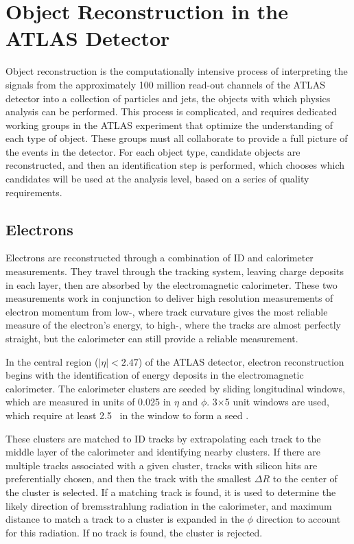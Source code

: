\chapter{Object Reconstruction in the \ac{ATLAS} Detector} %
\label{ch:reconstruction} 

Object reconstruction is the computationally intensive process of interpreting the signals from the approximately 100 million read-out channels of the \ac{ATLAS} detector into a collection of particles and jets, the objects with which physics analysis can be performed. This process is complicated, and requires dedicated working groups in the \ac{ATLAS} experiment that optimize the understanding of each type of object. These groups must all collaborate to provide a full picture of the events in the detector. For each object type, candidate objects are reconstructed, and then an identification step is performed, which chooses which candidates will be used at the analysis level, based on a series of quality requirements.


\section{Electrons}
\label{sec:reco_electrons}

Electrons are reconstructed through a combination of \ac{ID} and calorimeter measurements. They travel through the tracking system, leaving charge deposits in each layer, then are absorbed by the electromagnetic calorimeter. These two measurements work in conjunction to deliver high resolution measurements of electron momentum from low-\pt, where track curvature gives the most reliable measure of the electron's energy, to high-\pt, where the tracks are almost perfectly straight, but the calorimeter can still provide a reliable measurement. 

In the central region ($|\eta|<2.47$) of the \ac{ATLAS} detector, electron reconstruction begins with the identification of energy deposits in the electromagnetic calorimeter. The calorimeter clusters are seeded by sliding longitudinal windows, which are measured in units of 0.025 in $\eta$ and $\phi$. 3$\times$5 unit windows are used, which require at least 2.5 \gev~in the window to form a seed \cite{Aad:2011mk}. 

These clusters are matched to \ac{ID} tracks by extrapolating each track to the middle layer of the calorimeter and identifying nearby clusters. If there are multiple tracks associated with a given cluster, tracks with silicon hits are preferentially chosen, and then the track with the smallest $\Delta R$ to the center of the cluster is selected. If a matching track is found, it is used to determine the likely direction of bremsstrahlung radiation in the calorimeter, and maximum distance to match a track to a cluster is expanded in the $\phi$ direction to account for this radiation. If no track is found, the cluster is rejected. 

